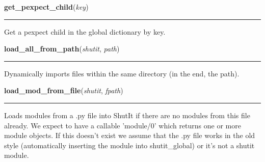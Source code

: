     \label{util:get_pexpect_child}

    \vspace{0.5ex}

\hspace{.8\funcindent}\begin{boxedminipage}{\funcwidth}

    \raggedright \textbf{get\_pexpect\_child}(\textit{key})

    \vspace{-1.5ex}

    \rule{\textwidth}{0.5\fboxrule}
\setlength{\parskip}{2ex}
    Get a pexpect child in the global dictionary by key.

\setlength{\parskip}{1ex}
    \end{boxedminipage}

    \label{util:load_all_from_path}

    \vspace{0.5ex}

\hspace{.8\funcindent}\begin{boxedminipage}{\funcwidth}

    \raggedright \textbf{load\_all\_from\_path}(\textit{shutit}, \textit{path})

    \vspace{-1.5ex}

    \rule{\textwidth}{0.5\fboxrule}
\setlength{\parskip}{2ex}
    Dynamically imports files within the same directory (in the end, the 
    path).

\setlength{\parskip}{1ex}
    \end{boxedminipage}

    \label{util:load_mod_from_file}

    \vspace{0.5ex}

\hspace{.8\funcindent}\begin{boxedminipage}{\funcwidth}

    \raggedright \textbf{load\_mod\_from\_file}(\textit{shutit}, \textit{fpath})

    \vspace{-1.5ex}

    \rule{\textwidth}{0.5\fboxrule}
\setlength{\parskip}{2ex}
    Loads modules from a .py file into ShutIt if there are no modules from 
    this file already. We expect to have a callable 'module/0' which 
    returns one or more module objects. If this doesn't exist we assume 
    that the .py file works in the old style (automatically inserting the 
    module into shutit\_global) or it's not a shutit module.

\setlength{\parskip}{1ex}
    \end{boxedminipage}

